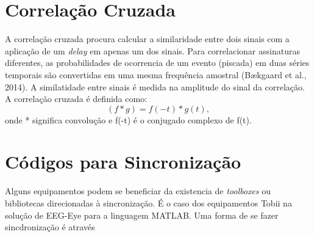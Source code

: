 \section{Correlação Cruzada}
A correlação cruzada procura calcular a similaridade entre dois sinais com a aplicação de um \textit{delay} em apenas um dos sinais.
Para correlacionar assinaturas diferentes, as probabilidades de ocorrencia de um evento (piscada) em duas séries temporais são convertidas em uma mesma frequência amostral (Bækgaard et al., 2014).
A similatidade entre sinais é medida na amplitude do sinal da correlação. A correlação cruzada é definida como:
\begin{equation}\label{eq:correlação cruzada}
    (f * g) = f(-t)*g(t), 
    \end{equation}
onde * significa convolução e f(-t) é o conjugado complexo de f(t).


\section{Códigos para Sincronização}
Alguns equipamentos podem se beneficiar da existencia de \textit{toolboxes} ou bibliotecas direcionadas à sincronização. É o caso 
dos equipamentos Tobii na solução de EEG-Eye para a linguagem MATLAB. Uma forma de se fazer sincdronização é através 
